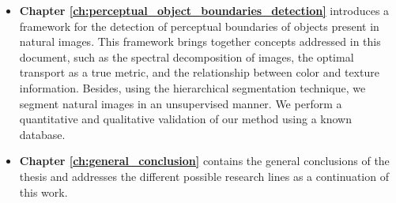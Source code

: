 \begin{itemize}
	\item \textbf{Chapter \ref{ch:perceptual_object_boundaries_detection}} introduces a framework for the detection of perceptual boundaries of objects present in natural images. This framework brings together concepts addressed in this document, such as the spectral decomposition of images, the optimal transport as a true metric, and the relationship between color and texture information. Besides, using the hierarchical segmentation technique, we segment natural images in an unsupervised manner. We perform a quantitative and qualitative validation of our method using a known database.
	
	\item \textbf{Chapter \ref{ch:general_conclusion}} contains the general conclusions of the thesis and addresses the different possible research lines as a continuation of this work.
	
\end{itemize}